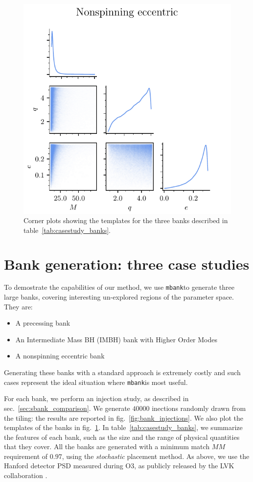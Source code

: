 \documentclass[twocolumn,showpacs,preprintnumbers,nofootinbib,prd,
superscriptaddress,10pt]{revtex4-2}
\newcommand{\mbank}{\texttt{mbank}}
\begin{document}
\begin{figure}[t]
	\includegraphics{bank_scatter_Nonspinning_eccentric}
	\caption{Corner plots showing the templates for the three banks described in table~\ref{tab:casestudy_banks}. }
	\label{fig:bank_scatter}
\end{figure}

\section{Bank generation: three case studies} \label{sec:bank_generation}

To demostrate the capabilities of our method, we use \mbank to generate three large banks, covering interesting un-explored regions of the parameter space.
They are:
	\begin{itemize}
		\item A precessing bank
		\item An Intermediate Mass BH (IMBH) bank with Higher Order Modes
		\item A nonspinning eccentric bank
	\end{itemize}
Generating these banks with a standard approach is extremely costly and such cases represent the ideal situation where \mbank is most useful.

For each bank, we perform an injection study, as described in sec.~\ref{sec:sbank_comparison}. We generate $40000$ inections randomly drawn from the tiling: the results are reported in fig.~\ref{fig:bank_injections}. We also plot the templates of the banks in fig.~\ref{fig:bank_scatter}.
In table~\ref{tab:casestudy_banks}, we summarize the features of each bank, such as the size and the range of physical quantities that they cover.
All the banks are generated with a minimum match $MM$ requirement of $0.97$, using the {\it stochastic} placement method.
As above, we use the Hanford detector PSD measured during O3, as publicly released by the LVK collaboration \cite{https://dcc.ligo.org/LIGO-T2000012/public}.
\end{document}
